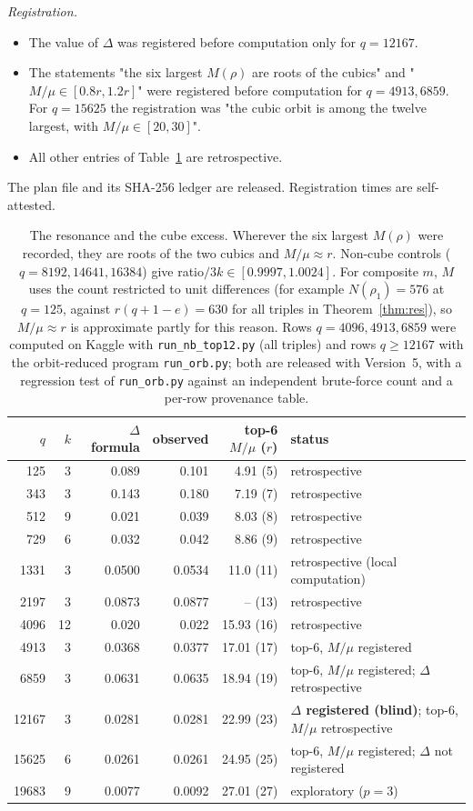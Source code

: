 \documentclass[11pt]{article}
\begin{document}
\emph{Registration.}
\begin{itemize}
\item The value of $\Delta$ was registered before computation only for $q=12167$.
\item The statements "the six largest $M(\rho)$ are roots of the cubics" and "$M/\mu\in[0.8r,1.2r]$" were registered before computation for $q=4913,6859$. For $q=15625$ the registration was "the cubic orbit is among the twelve largest, with $M/\mu\in[20,30]$".
\item All other entries of Table~\ref{tab:res} are retrospective.
\end{itemize}
The plan file and its SHA-256 ledger are released. Registration times are self-attested.
\begin{table}[h]\centering\small
\begin{tabular}{rrrrrl}\toprule $q$&$k$&$\Delta$ formula&observed&top-6 $M/\mu$ ($r$)&status\\ \midrule
125&3&0.089&0.101&4.91 (5)&retrospective\\
343&3&0.143&0.180&7.19 (7)&retrospective\\
512&9&0.021&0.039&8.03 (8)&retrospective\\
729&6&0.032&0.042&8.86 (9)&retrospective\\
1331&3&0.0500&0.0534&11.0 (11)&retrospective (local computation)\\
2197&3&0.0873&0.0877&-- (13)&retrospective\\
4096&12&0.020&0.022&15.93 (16)&retrospective\\
4913&3&0.0368&0.0377&17.01 (17)&top-6, $M/\mu$ registered\\
6859&3&0.0631&0.0635&18.94 (19)&top-6, $M/\mu$ registered; $\Delta$ retrospective\\
12167&3&0.0281&0.0281&22.99 (23)&\textbf{$\Delta$ registered (blind)}; top-6, $M/\mu$ retrospective\\
15625&6&0.0261&0.0261&24.95 (25)&top-6, $M/\mu$ registered; $\Delta$ not registered\\
19683&9&0.0077&0.0092&27.01 (27)&exploratory ($p=3$)\\
\bottomrule\end{tabular}
\caption{The resonance and the cube excess. Wherever the six largest $M(\rho)$ were recorded, they are roots of the two cubics and $M/\mu\approx r$.
Non-cube controls ($q=8192,14641,16384$) give ratio$/3k\in[0.9997,1.0024]$. For composite $m$, $M$ uses the count restricted to unit differences
(for example $N(\rho_1)=576$ at $q=125$, against $r(q+1-e)=630$ for all triples in Theorem~\ref{thm:res}), so $M/\mu\approx r$ is approximate partly for this reason.
Rows $q=4096,4913,6859$ were computed on Kaggle with \texttt{run\_nb\_top12.py} (all triples) and rows $q\ge12167$ with the orbit-reduced program \texttt{run\_orb.py};
both are released with Version~5, with a regression test of \texttt{run\_orb.py} against an independent brute-force count and a per-row provenance table.}\label{tab:res}\end{table}
\end{document}

